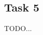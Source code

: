 \documentclass[a4paper, DIV12, headsepline]{scrartcl}
\begin{document}







\subsection*{Task 5}
TODO...

\end{document}
